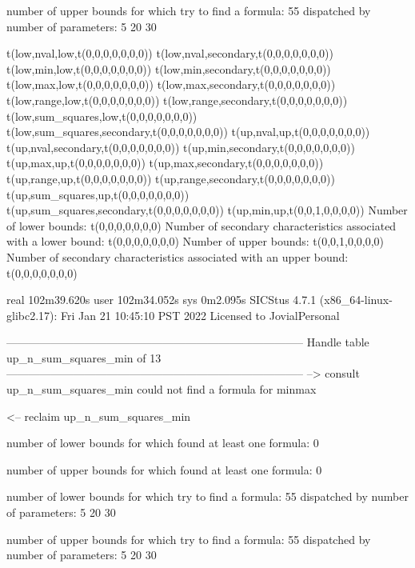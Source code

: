 number of upper bounds for which try to find a formula: 55
dispatched by number of parameters: 5  20  30

t(low,nval,low,t(0,0,0,0,0,0,0))
t(low,nval,secondary,t(0,0,0,0,0,0,0))
t(low,min,low,t(0,0,0,0,0,0,0))
t(low,min,secondary,t(0,0,0,0,0,0,0))
t(low,max,low,t(0,0,0,0,0,0,0))
t(low,max,secondary,t(0,0,0,0,0,0,0))
t(low,range,low,t(0,0,0,0,0,0,0))
t(low,range,secondary,t(0,0,0,0,0,0,0))
t(low,sum_squares,low,t(0,0,0,0,0,0,0))
t(low,sum_squares,secondary,t(0,0,0,0,0,0,0))
t(up,nval,up,t(0,0,0,0,0,0,0))
t(up,nval,secondary,t(0,0,0,0,0,0,0))
t(up,min,secondary,t(0,0,0,0,0,0,0))
t(up,max,up,t(0,0,0,0,0,0,0))
t(up,max,secondary,t(0,0,0,0,0,0,0))
t(up,range,up,t(0,0,0,0,0,0,0))
t(up,range,secondary,t(0,0,0,0,0,0,0))
t(up,sum_squares,up,t(0,0,0,0,0,0,0))
t(up,sum_squares,secondary,t(0,0,0,0,0,0,0))
t(up,min,up,t(0,0,1,0,0,0,0))
Number of lower bounds:                                             t(0,0,0,0,0,0,0)
Number of secondary characteristics associated with a lower bound:  t(0,0,0,0,0,0,0)
Number of upper bounds:                                             t(0,0,1,0,0,0,0)
Number of secondary characteristics associated with an upper bound: t(0,0,0,0,0,0,0)

real	102m39.620s
user	102m34.052s
sys	0m2.095s
SICStus 4.7.1 (x86_64-linux-glibc2.17): Fri Jan 21 10:45:10 PST 2022
Licensed to JovialPersonal


--------------------------------------------------------------------------------
Handle table up_n_sum_squares_min of 13
--------------------------------------------------------------------------------
--> consult up_n_sum_squares_min
could not find a formula for minmax

<-- reclaim up_n_sum_squares_min

number of lower bounds for which found at least one formula: 0

number of upper bounds for which found at least one formula: 0

number of lower bounds for which try to find a formula: 55
dispatched by number of parameters: 5  20  30

number of upper bounds for which try to find a formula: 55
dispatched by number of parameters: 5  20  30

